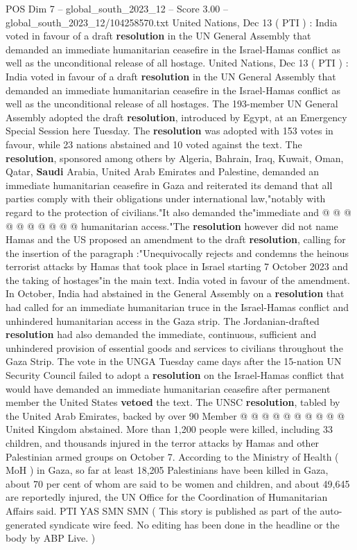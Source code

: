 \begin{textsample}{POS Dim 7 – global\_south\_2023\_12 – Score 3.00 – global\_south\_2023\_12/104258570.txt}  \label{ex:f7_pos_032}
United Nations, Dec 13 ( PTI ) : India voted in favour of a draft \textbf{resolution} in the UN General Assembly that demanded an immediate humanitarian ceasefire in the Israel-Hamas conflict as well as the unconditional release of all hostage.
United Nations, Dec 13 ( PTI ) : India voted in favour of a draft \textbf{resolution} in the UN General Assembly that demanded an immediate humanitarian ceasefire in the Israel-Hamas conflict as well as the unconditional release of all hostages.
The 193-member UN General Assembly adopted the draft \textbf{resolution}, introduced by Egypt, at an Emergency Special Session here Tuesday.
The \textbf{resolution} was adopted with 153 votes in favour, while 23 nations abstained and 10 voted against the text.
The \textbf{resolution}, sponsored among others by Algeria, Bahrain, Iraq, Kuwait, Oman, Qatar, \textbf{Saudi} Arabia, United Arab Emirates and Palestine, demanded an immediate humanitarian ceasefire in Gaza and reiterated its demand that all parties comply with their obligations under international law,"notably with regard to the protection of civilians."It also demanded the"immediate and @ @ @ @ @ @ @ @ @ @ humanitarian access."The \textbf{resolution} however did not name Hamas and the US proposed an amendment to the draft \textbf{resolution}, calling for the insertion of the paragraph :"Unequivocally rejects and condemns the heinous terrorist attacks by Hamas that took place in Israel starting 7 October 2023 and the taking of hostages"in the main text.
India voted in favour of the amendment.
In October, India had abstained in the General Assembly on a \textbf{resolution} that had called for an immediate humanitarian truce in the Israel-Hamas conflict and unhindered humanitarian access in the Gaza strip.
The Jordanian-drafted \textbf{resolution} had also demanded the immediate, continuous, sufficient and unhindered provision of essential goods and services to civilians throughout the Gaza Strip.
The vote in the UNGA Tuesday came days after the 15-nation UN Security Council failed to adopt a \textbf{resolution} on the Israel-Hamas conflict that would have demanded an immediate humanitarian ceasefire after permanent member the United States \textbf{vetoed} the text.
The UNSC \textbf{resolution}, tabled by the United Arab Emirates, backed by over 90 Member @ @ @ @ @ @ @ @ @ @ United Kingdom abstained.
More than 1,200 people were killed, including 33 children, and thousands injured in the terror attacks by Hamas and other Palestinian armed groups on October 7.
According to the Ministry of Health ( MoH ) in Gaza, so far at least 18,205 Palestinians have been killed in Gaza, about 70 per cent of whom are said to be women and children, and about 49,645 are reportedly injured, the UN Office for the Coordination of Humanitarian Affairs said.
PTI YAS SMN SMN ( This story is published as part of the auto-generated syndicate wire feed.
No editing has been done in the headline or the body by ABP Live. )

\end{textsample}
